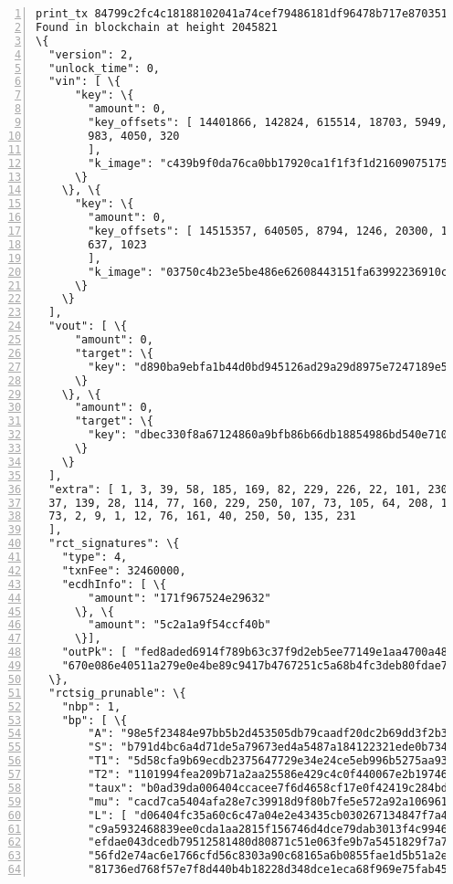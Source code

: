 \begin{Verbatim}[commandchars=\\\{\}, numbers=left]
print_tx 84799c2fc4c18188102041a74cef79486181df96478b717e8703512c7f7f3349
Found in blockchain at height 2045821
\{
  "version": 2, 
  "unlock_time": 0, 
  "vin": [ \{
      "key": \{
        "amount": 0, 
        "key_offsets": [ 14401866, 142824, 615514, 18703, 5949, 22840, 5572, 16439,
        983, 4050, 320
        ], 
        "k_image": "c439b9f0da76ca0bb17920ca1f1f3f1d216090751752b091bef9006918cb3db4"
      \}
    \}, \{
      "key": \{
        "amount": 0, 
        "key_offsets": [ 14515357, 640505, 8794, 1246, 20300, 18577, 17108, 9824, 581,
        637, 1023
        ], 
        "k_image": "03750c4b23e5be486e62608443151fa63992236910c41fa0c4a0a938bc6f5a37"
      \}
    \}
  ], 
  "vout": [ \{
      "amount": 0, 
      "target": \{
        "key": "d890ba9ebfa1b44d0bd945126ad29a29d8975e7247189e5076c19fa7e3a8cb00"
      \}
    \}, \{
      "amount": 0, 
      "target": \{
        "key": "dbec330f8a67124860a9bfb86b66db18854986bd540e710365ad6079c8a1c7b0"
      \}
    \}
  ], 
  "extra": [ 1, 3, 39, 58, 185, 169, 82, 229, 226, 22, 101, 230, 254, 20, 143,
  37, 139, 28, 114, 77, 160, 229, 250, 107, 73, 105, 64, 208, 154, 182, 158, 200,
  73, 2, 9, 1, 12, 76, 161, 40, 250, 50, 135, 231
  ], 
  "rct_signatures": \{
    "type": 4, 
    "txnFee": 32460000, 
    "ecdhInfo": [ \{
        "amount": "171f967524e29632"
      \}, \{
        "amount": "5c2a1a9f54ccf40b"
      \}], 
    "outPk": [ "fed8aded6914f789b63c37f9d2eb5ee77149e1aa4700a482aea53f82177b3b41",
    "670e086e40511a279e0e4be89c9417b4767251c5a68b4fc3deb80fdae7269c17"]
  \}, 
  "rctsig_prunable": \{
    "nbp": 1, 
    "bp": [ \{
        "A": "98e5f23484e97bb5b2d453505db79caadf20dc2b69dd3f2b3dbf2a53ca280216", 
        "S": "b791d4bc6a4d71de5a79673ed4a5487a184122321ede0b7341bc3fdc0915a796", 
        "T1": "5d58cfa9b69ecdb2375647729e34e24ce5eb996b5275aa93f9871259f3a1aecd", 
        "T2": "1101994fea209b71a2aa25586e429c4c0f440067e2b197469aa1a9a1512f84b7", 
        "taux": "b0ad39da006404ccacee7f6d4658cf17e0f42419c284bdca03c0250303706c03", 
        "mu": "cacd7ca5404afa28e7c39918d9f80b7fe5e572a92a10696186d029b4923fa200", 
        "L": [ "d06404fc35a60c6c47a04e2e43435cb030267134847f7a49831a61f82307fc32",
        "c9a5932468839ee0cda1aa2815f156746d4dce79dab3013f4c9946fce6b69eff",
        "efdae043dcedb79512581480d80871c51e063fe9b7a5451829f7a7824bcc5a0b",
        "56fd2e74ac6e1766cfd56c8303a90c68165a6b0855fae1d5b51a2e035f333a1d",
        "81736ed768f57e7f8d440b4b18228d348dce1eca68f969e75fab458f44174c99",

\end{Verbatim}
